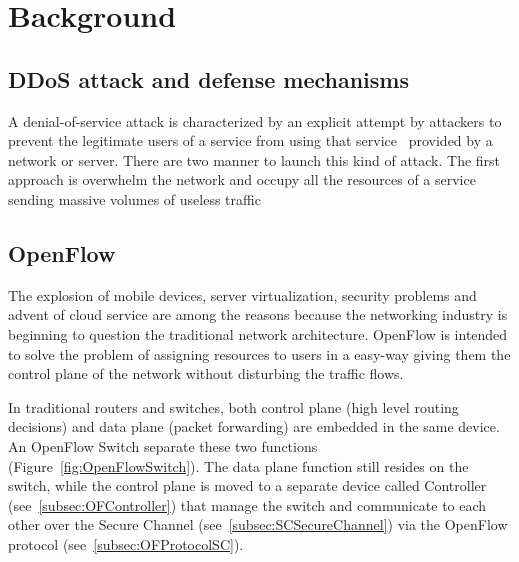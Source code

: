 \chapter{Background}
\label{chapter:background} 



\section{DDoS attack and defense mechanisms}
\label{sec:BGDDoS}

A denial-of-service attack is characterized by an explicit attempt by attackers to prevent the legitimate users of a service from using that service~\cite{dosCert} provided by a network or server. There are two manner to launch this kind of attack. The first approach is overwhelm the network and occupy all the resources of a service sending massive volumes of useless traffic

\section{OpenFlow}
\label{sec:BGOpenFlow}

The explosion of mobile devices, server virtualization, security problems and advent of cloud service are among the reasons because the networking industry is beginning to question the traditional network architecture. OpenFlow is intended to solve the problem of assigning resources to users in a easy-way giving them the control plane of the network without disturbing the traffic flows. 

\par 

In traditional routers and switches, both control plane (high level routing decisions) and data plane (packet forwarding) are embedded in the same device. An OpenFlow Switch separate these two functions (Figure~\ref{fig:OpenFlowSwitch}). The data plane function still resides on the switch, while the control plane is moved to a separate device called Controller (see~\ref{subsec:OFController}) that manage the switch and communicate to each other over the Secure Channel (see~\ref{subsec:SCSecureChannel}) via the OpenFlow protocol (see~\ref{subsec:OFProtocolSC}).

\par 

